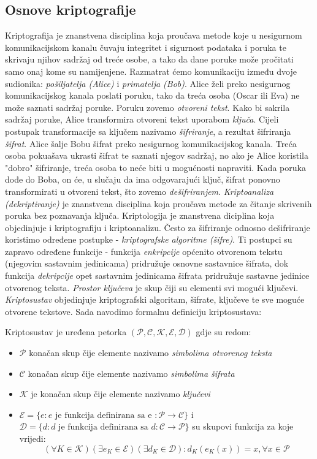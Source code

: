 \documentclass[a4paper,oneside,12pt]{memoir} %
\begin{document}
\begin{spacing}{1.5}
\section{Osnove kriptografije}
\label{sec:kripto}
Kriptografija je znanstvena disciplina koja proučava metode koje u nesigurnom komunikacijskom kanalu  čuvaju integritet i sigurnost podataka i poruka te skrivaju njihov sadržaj od treće osobe, a tako da dane poruke može pročitati samo onaj kome su namijenjene. Razmatrat ćemo komunikaciju između dvoje sudionika: \textit{pošiljatelja (Alice)} i \textit{primatelja (Bob)}. Alice želi preko nesigurnog komunikacijskog kanala poslati poruku, tako da  treća osoba (Oscar ili Eva) ne može saznati sadržaj poruke. Poruku zovemo \textit{otvoreni tekst}. Kako bi sakrila sadržaj poruke, Alice transformira otvoreni tekst uporabom \textit{ključa}. Cijeli postupak transformacije sa ključem nazivamo \textit{šifriranje}, a rezultat šifriranja \textit{šifrat}. Alice šalje Bobu šifrat preko nesigurnog komunikacijskog kanala. Treća osoba pokuašava ukrasti šifrat te saznati njegov sadržaj, no ako je Alice koristila "dobro" šifriranje, treća osoba to neće biti u mogućnosti napraviti. Kada poruka dođe do Boba, on će, u slučaju da ima odgovarajući ključ, šifrat ponovno transformirati u otvoreni tekst, što zovemo \textit{dešifriranjem}. \textit{Kriptoanaliza (dekriptiranje)} je znanstvena disciplina koja proučava metode za čitanje skrivenih poruka bez poznavanja ključa. Kriptologija je znanstvena diciplina koja objedinjuje i kriptografiju i kriptoanalizu. Često za šifriranje odnosno dešifriranje koristimo određene postupke - \textit{kriptografske algoritme (šifre)}. Ti postupci su zapravo određene funkcije - funkcija \textit{enkripcije} općenito otvorenom tekstu (njegovim sastavnim jedinicama) pridružuje osnovne sastavnice šifrata, dok funkcija \textit{dekripcije} opet sastavnim jedinicama šifrata pridružuje sastavne jedinice otvorenog teksta. \textit{Prostor ključeva} je skup čiji su elementi svi mogući ključevi. \textit{Kriptosustav} objedinjuje kriptografski algoritam,   šifrate, ključeve te sve moguće otvorene tekstove.
Sada navodimo formalnu definiciju kriptosustava:
\begin{defn}
Kriptosustav je uređena petorka $(\mathcal{P}, \mathcal{C}, \mathcal{K}, \mathcal{E}, \mathcal{D})$ gdje su redom:
\begin{itemize}
	\item $\mathcal{P}$ konačan skup čije elemente nazivamo \textit{simbolima otvorenog teksta}
	\item $\mathcal{C}$ konačan skup čije elemente nazivamo \textit{simbolima šifrata}
	\item $\mathcal{K}$ je konačan skup čije elemente nazivamo \textit{ključevi}
	\item $\mathcal{E}=\{e :e \text{  je funkcija definirana sa e }:\mathcal{P} \to \mathcal{C} \}$ i $\mathcal{D}=\{d: d\text{ je funkcija definirana sa } d: \mathcal{C} \to \mathcal{P}\}$ su skupovi funkcija za koje vrijedi:
	\[(\forall K \in \mathcal{K})(\exists e_K \in \mathcal{E})(\exists d_K \in \mathcal{D}) : d_K(e_K(x))=x, \forall x \in \mathcal{P} \]
	

\end{itemize}
\end{defn}
\end{spacing}
\end{document}
